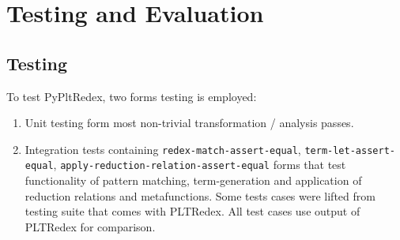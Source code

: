 \chapter{Testing and Evaluation}

\section{Testing}

To test PyPltRedex, two forms testing is employed: 

\begin{enumerate}
\item Unit testing form most non-trivial transformation / analysis passes.
\item Integration tests containing \texttt{redex-match-assert-equal}, \texttt{term-let-assert-equal}, \texttt{apply-reduction-relation-assert-equal} forms that test functionality of pattern matching, term-generation and application of reduction relations and metafunctions. Some tests cases were lifted from testing suite that comes with PLTRedex. All test cases use output of PLTRedex for comparison.
\end{enumerate}

